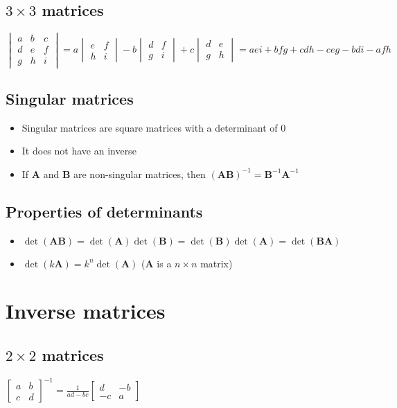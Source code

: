 \subsection{$3\times3$ matrices}

$\begin{vmatrix}a&b&c\\d&e&f\\g&h&i\end{vmatrix}=a\begin{vmatrix}e&f\\h&i\end{vmatrix}-b\begin{vmatrix}d&f\\g&i\end{vmatrix}+c\begin{vmatrix}d&e\\g&h\end{vmatrix}=aei+bfg+cdh-ceg-bdi-afh$

\subsection{Singular matrices}
\begin{itemize}
    \item Singular matrices are square matrices with a determinant of 0
    \item It does not have an inverse
    \item If $\mathbf{A}$ and $\mathbf{B}$ are non-singular matrices, then $(\mathbf{AB})^{-1}=\mathbf{B}^{-1}\mathbf{A}^{-1}$
\end{itemize}



\subsection{Properties of determinants}
\begin{itemize}
    \item $\det(\mathbf{AB})=\det(\mathbf{A})\det(\mathbf{B})=\det(\mathbf{B})\det(\mathbf{A})=\det(\mathbf{BA})$
    \item $\det(k\mathbf{A})=k^n\det(\mathbf{A})$ ($\mathbf{A}$ is a $n\times n$ matrix)
\end{itemize}


\section{Inverse matrices}
\subsection{$2\times2$ matrices}
$\begin{bmatrix}
        a & b \\c & d
    \end{bmatrix}^{-1}=\frac{1}{ad-bc}\begin{bmatrix}
        d & -b \\-c & a
    \end{bmatrix}$

